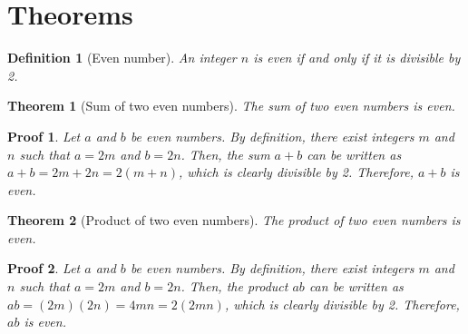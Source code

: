 \documentclass{article}
\theoremstyle{definitionstyle} %
\newtheorem{definition}{Definition}[section] %
\theoremstyle{theoremstyle} %
\newtheorem{theorem}{Theorem}[section] %
\theoremstyle{proofstyle} %
\newtheorem*{proof*}{Proof} %
\begin{document}
\section{Theorems}

\begin{definition}[Even number]
An integer $n$ is \emph{even} if and only if it is divisible by 2.
\end{definition}

\begin{theorem}[Sum of two even numbers]
The sum of two even numbers is even.
\end{theorem}

\begin{proof*}
Let $a$ and $b$ be even numbers. By definition, there exist integers $m$ and $n$ such that $a = 2m$ and $b = 2n$. Then, the sum $a+b$ can be written as $a+b=2m+2n=2(m+n)$, which is clearly divisible by 2. Therefore, $a+b$ is even.
\end{proof*}

\begin{theorem}[Product of two even numbers]
The product of two even numbers is even.
\end{theorem}

\begin{proof*}
Let $a$ and $b$ be even numbers. By definition, there exist integers $m$ and $n$ such that $a = 2m$ and $b = 2n$. Then, the product $ab$ can be written as $ab=(2m)(2n)=4mn=2(2mn)$, which is clearly divisible by 2. Therefore, $ab$ is even.
\end{proof*}
\end{document}
